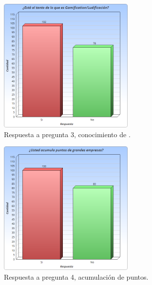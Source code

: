 \begin{figure}[!htb]
    \centering
    \includegraphics[width=0.6\textwidth]{images/Graficos/graf_5_1.png}
    \caption[Gráfico pregunta 3 de encuesta, conocimiento de {\gam}.]{Respuesta a pregunta $3$, conocimiento de {\gam}.}
    \label{fig:chart5.1}
\end{figure}

\begin{figure}[!htb]
    \centering
    \includegraphics[width=0.6\textwidth]{images/Graficos/graf_5_2.png}
    \caption[Gráfico pregunta 4, acumulación de puntos.]{Respuesta a pregunta 4, acumulación de puntos.}
    \label{fig:chart5.2}
\end{figure}

